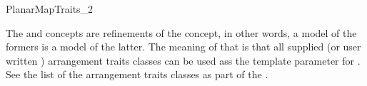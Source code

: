 \begin{ccRefConcept}{PlanarMapTraits_2}

\ccHasModels

  The  and
   concepts are refinements of the
   concept, in other words, a model of the
  formers is a model of the latter.  The meaning of that is that all
  supplied (or user written ) arrangement traits classes can be used
  ass the  template parameter for
  .  See the list of the arrangement
  traits classes as part of the .
  
\end{ccRefConcept} %

\ccRefPageEnd















